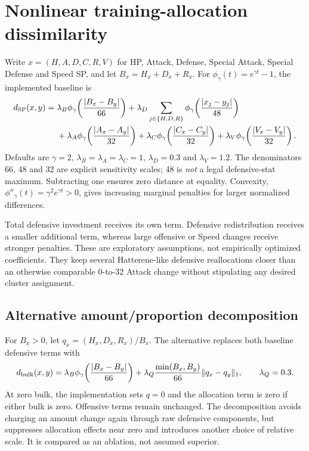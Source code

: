 \documentclass[10pt,a4paper]{article}
\newcommand{\SP}{\mathrm{SP}}
\begin{document}
\section{Nonlinear training-allocation dissimilarity}
Write $x=(H,A,D,C,R,V)$ for HP, Attack, Defense, Special Attack, Special Defense and Speed SP, and let $B_x=H_x+D_x+R_x$. For $\phi_\gamma(t)=e^{\gamma t}-1$, the implemented baseline is
\begin{align}
 d_{\SP}(x,y)={}&\lambda_B\phi_\gamma\!\left(\frac{|B_x-B_y|}{66}\right)
 +\lambda_D\sum_{j\in\{H,D,R\}}\phi_\gamma\!\left(\frac{|x_j-y_j|}{48}\right)\notag\\
 &+\lambda_A\phi_\gamma\!\left(\frac{|A_x-A_y|}{32}\right)
 +\lambda_C\phi_\gamma\!\left(\frac{|C_x-C_y|}{32}\right)
 +\lambda_V\phi_\gamma\!\left(\frac{|V_x-V_y|}{32}\right).
 \label{eq:sp}
\end{align}
Defaults are $\gamma=2$, $\lambda_B=\lambda_A=\lambda_C=1$, $\lambda_D=0.3$ and $\lambda_V=1.2$. The denominators 66, 48 and 32 are explicit sensitivity scales; 48 is \emph{not} a legal defensive-stat maximum. Subtracting one ensures zero distance at equality. Convexity, $\phi''_\gamma(t)=\gamma^2e^{\gamma t}>0$, gives increasing marginal penalties for larger normalized differences.

Total defensive investment receives its own term. Defensive redistribution receives a smaller additional term, whereas large offensive or Speed changes receive stronger penalties. These are exploratory assumptions, not empirically optimized coefficients. They keep several Hatterene-like defensive reallocations closer than an otherwise comparable 0-to-32 Attack change without stipulating any desired cluster assignment.

\subsection{Alternative amount/proportion decomposition}
For $B_x>0$, let $q_x=(H_x,D_x,R_x)/B_x$. The alternative replaces both baseline defensive terms with
\begin{equation}
 d_{\rm bulk}(x,y)=\lambda_B\phi_\gamma\!\left(\frac{|B_x-B_y|}{66}\right)
 +\lambda_Q\frac{\min(B_x,B_y)}{66}\|q_x-q_y\|_1,\qquad\lambda_Q=0.3.
\end{equation}
At zero bulk, the implementation sets $q=0$ and the allocation term is zero if either bulk is zero. Offensive terms remain unchanged. The decomposition avoids charging an amount change again through raw defensive components, but suppresses allocation effects near zero and introduces another choice of relative scale. It is compared as an ablation, not assumed superior.
\end{document}
